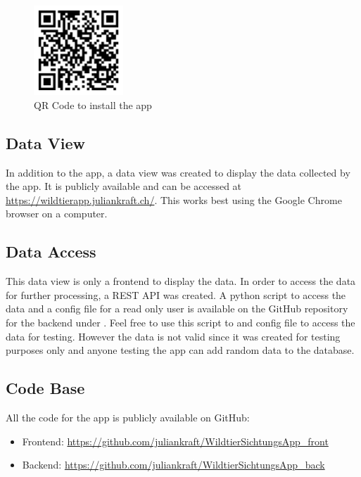 \documentclass{josis}
\begin{document}
\begin{figure}[tbh]
    \centering
    \includegraphics[width=0.3\textwidth]{images/qr_code_app.png}
    \caption{QR Code to install the app}\label{fig:qr_code_app}
\end{figure}

\subsection{Data View}

In addition to the app, a data view was created to display the data collected by the app. It is publicly available and can be 
accessed at \url{https://wildtierapp.juliankraft.ch/}. This works best using the Google Chrome browser on a computer.

\subsection{Data Access}

This data view is only a frontend to display the data. In order to access the data for further processing, a REST API was created.
A python script to access the data and a config file for a read only user is available on the GitHub repository 
for the backend under .
Feel free to use this script to and config file to access the data for testing. However the data is not valid since it was created for testing purposes only
and anyone testing the app can add random data to the database.

\subsection{Code Base}
All the code for the app is publicly available on GitHub:
\begin{itemize}
    \item Frontend: \url{https://github.com/juliankraft/WildtierSichtungsApp_front}
    \item Backend: \url{https://github.com/juliankraft/WildtierSichtungsApp_back}
\end{itemize}
\end{document}
